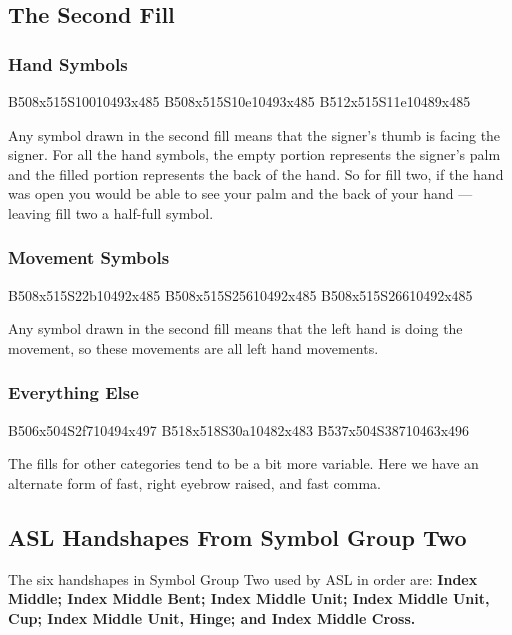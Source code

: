 \documentclass{article}
\begin{document}
\subsection{The Second Fill}

\subsubsection{Hand Symbols}

\begin{center}
B508x515S10010493x485 B508x515S10e10493x485 B512x515S11e10489x485
\end{center}

Any symbol drawn in the second fill means that the signer's thumb is facing the signer.
For all the hand symbols, the empty portion represents the signer's palm and the filled portion represents the back of the hand.
So for fill two, if the hand was open you would be able to see your palm and the back of your hand --- leaving fill two a half-full symbol.

\subsubsection{Movement Symbols}

\begin{center}
B508x515S22b10492x485 B508x515S25610492x485 B508x515S26610492x485
\end{center}

Any symbol drawn in the second fill means that the left hand is doing the movement, so these movements are all left hand movements.

\subsubsection{Everything Else}

\begin{center}
B506x504S2f710494x497 B518x518S30a10482x483 B537x504S38710463x496
\end{center}

The fills for other categories tend to be a bit more variable.
Here we have an alternate form of fast, right eyebrow raised, and fast comma.

\subsection{ASL Handshapes From Symbol Group Two}

The six handshapes in Symbol Group Two used by ASL in order are:
{\bf
Index Middle;
Index Middle Bent;
Index Middle Unit;
Index Middle Unit, Cup;
Index Middle Unit, Hinge;
and Index Middle Cross.
}
\end{document}
